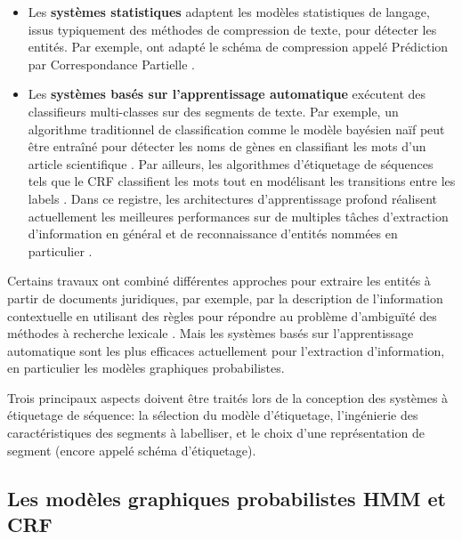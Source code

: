 \begin{itemize}
\item Les \textbf{systèmes statistiques} adaptent les modèles statistiques de langage, issus typiquement des méthodes de compression de texte, pour détecter les entités. Par exemple, \citet{witten1999languagemodel} ont adapté le schéma de compression appelé \og Prédiction par Correspondance Partielle \fg{}.

\item Les \textbf{systèmes basés sur l'apprentissage automatique} exécutent des classifieurs multi-classes sur des segments de texte. Par exemple, un algorithme traditionnel de classification comme le modèle bayésien naïf peut être entraîné pour détecter les noms de gènes en classifiant les mots d'un article scientifique \citep{persson2012nbbioner}. Par ailleurs, les algorithmes d'étiquetage de séquences tels que le CRF classifient les mots tout en modélisant les transitions entre les labels \citep{finkel2005stanfordcrfner}. Dans ce registre, les architectures d'apprentissage profond réalisent actuellement les meilleures performances sur de multiples tâches d'extraction d'information en général et de reconnaissance d'entités nommées en particulier \citep{lample2016nnner}.
\end{itemize}
Certains travaux ont combiné différentes approches pour extraire les entités à partir de documents juridiques,  par exemple,  par la description de l'information contextuelle en utilisant des règles pour répondre au problème d'ambiguïté des méthodes à recherche lexicale \citep{mikheev1999NERlexicalWithRules,hanisch2005prominer}. Mais les systèmes basés sur l'apprentissage automatique sont les plus efficaces actuellement pour l'extraction d'information, en particulier les modèles graphiques probabilistes.

Trois principaux aspects doivent être traités lors de la conception des systèmes à  étiquetage de séquence: la sélection du modèle d'étiquetage, l'ingénierie des caractéristiques des segments à labelliser, et le choix d'une représentation de segment (encore appelé schéma d'étiquetage). 

\subsection{Les modèles graphiques probabilistes HMM et CRF}

